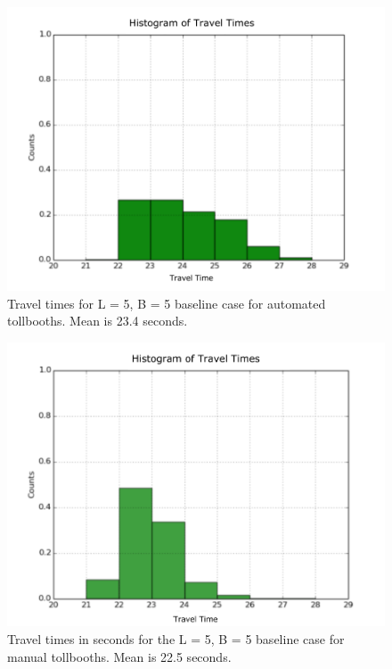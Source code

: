 \documentclass[a4paper, 11pt]{article}
\begin{document}


\begin{figure}[H]
\begin{center}
\includegraphics[scale=0.25]{Images/55_ez.png}
\caption{Travel times for L = 5, B = 5 baseline case for automated tollbooths. Mean is 23.4 seconds. }
\label{fig:ez55}
\end{center}
\end{figure}

\begin{figure}[H]
\begin{center}
\includegraphics[scale=0.3]{Images/55_man.png}
\caption{Travel times in seconds for the L = 5, B = 5 baseline case for manual tollbooths. Mean is 22.5 seconds.}
\label{fig:manual55}
\end{center}
\end{figure}
\end{document}
